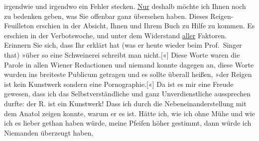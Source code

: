 \begin{ledgroupsized}[t]{13cm}
               irgendwie und irgendwo {\pb}ein
               Fehler stecken. \pend
           \pstart
           \uline{Nur} deshalb möchte ich Ihnen noch zu bedenken geben,
               was Sie offenbar ganz übersehen haben. Dieses Reigen-Feuilleton erschien in der Absicht, Ihnen und Ihrem
               Buch zu Hilfe zu kommen. Es erschien in der Verbotswoche, und unter dem Widerstand
                  \uline{aller} Faktoren. Erinnern Sie sich, dass Ihr
                  \label{K_L03353-123v}\label{K_L03353-1234h} erklärt hat (was er heute wieder beim Prof. Singer that) »über so eine Schweinerei schreibt man
                  nicht.{[}«{]} Diese Worte waren die Parole in allen Wiener Redactionen und niemand konnte dagegen an,
               diese Worte wurden ins breiteste Publicum getragen und es sollte überall heißen, »der
                  Reigen ist kein Kunstwerk sondern eine
                  Pornographie.{[}«{]} Da ist es mir eine Freude gewesen, dass ich
               das Selbstverständliche und ganz Unverdienstliche aussprechen durfte: der R. ist ein Kunstwerk! Dass ich durch die
               Nebeneinanderstellung mit dem Anatol zeigen
               konnte, warum er es ist. Hätte ich, wie ich ohne Mühe und wie ich es lieber gethan
               haben würde, meine Pfeifen höher gestimmt, dann würde ich Niemanden überzeugt haben,

\end{ledgroupsized}
